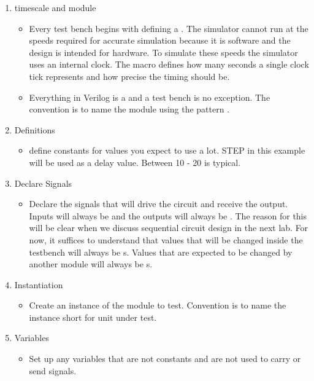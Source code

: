 \documentclass[12pt]{betterjournal}
\begin{document}
\begin{enumerate}
    \item timescale and module
    \begin{itemize}
        \item {} Every test bench begins with defining a . The simulator cannot run at the speeds required for accurate simulation because it is software and the design is intended for hardware. To simulate these speeds the simulator uses an internal clock. The  macro defines how many seconds a single clock tick represents and how precise the timing should be.
        \item {} Everything in Verilog is a  and a test bench is no exception. The convention is to name the module using the pattern .
    \end{itemize}
    \item Definitions
    \begin{itemize}
        \item define constants for values you expect to use a lot. STEP in this example will be used as a delay value. Between 10 - 20 is typical.
    \end{itemize}
    \item  Declare Signals
    \begin{itemize}
        \item Declare the signals that will drive the circuit and receive the output. Inputs will always be  and the outputs will always be . The reason for this will be clear when we discuss sequential circuit design in the next lab. For now, it suffices to understand that values that will be changed inside the testbench will always be s. Values that are expected to be changed by another module will always be s.
    \end{itemize}
    \item Instantiation
    \begin{itemize}
        \item Create an instance of the module to test. Convention is to name the instance  short for unit under test.
    \end{itemize}
    \item Variables
    \begin{itemize}
        \item Set up any variables that are not constants and are not used to carry or send signals.

\end{itemize}
\end{enumerate}
\end{document}
